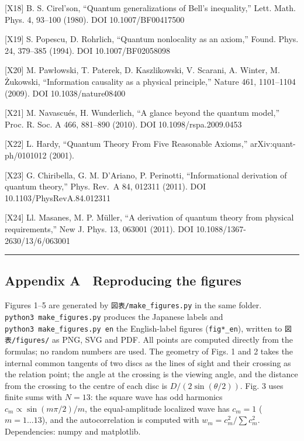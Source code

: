 \documentclass[
  a4paper,
]{article}
\begin{document}
{[}X18{]} B. S. Cirel'son, ``Quantum generalizations of Bell's
inequality,'' Lett. Math. Phys. 4, 93--100 (1980). DOI
10.1007/BF00417500

{[}X19{]} S. Popescu, D. Rohrlich, ``Quantum nonlocality as an axiom,''
Found. Phys. 24, 379--385 (1994). DOI 10.1007/BF02058098

{[}X20{]} M. Pawłowski, T. Paterek, D. Kaszlikowski, V. Scarani, A.
Winter, M. Żukowski, ``Information causality as a physical principle,''
Nature 461, 1101--1104 (2009). DOI 10.1038/nature08400

{[}X21{]} M. Navascués, H. Wunderlich, ``A glance beyond the quantum
model,'' Proc. R. Soc. A 466, 881--890 (2010). DOI
10.1098/rspa.2009.0453

{[}X22{]} L. Hardy, ``Quantum Theory From Five Reasonable Axioms,''
arXiv:quant-ph/0101012 (2001).

{[}X23{]} G. Chiribella, G. M. D'Ariano, P. Perinotti, ``Informational
derivation of quantum theory,'' Phys. Rev.~A 84, 012311 (2011). DOI
10.1103/PhysRevA.84.012311

{[}X24{]} Ll. Masanes, M. P. Müller, ``A derivation of quantum theory
from physical requirements,'' New J. Phys. 13, 063001 (2011). DOI
10.1088/1367-2630/13/6/063001

\begin{center}\rule{0.5\linewidth}{0.5pt}\end{center}

\subsection{Appendix A　Reproducing the
figures}\label{appendix-a-reproducing-the-figures}

Figures 1--5 are generated by \texttt{図表/\allowbreak{}make\_\allowbreak{}figures.py} in the same
folder. \texttt{python3\ make\_\allowbreak{}figures.py} produces the Japanese labels
and \texttt{python3\ make\_\allowbreak{}figures.py\ en} the English-label figures
(\texttt{fig*\_\allowbreak{}en}), written to \texttt{図表/\allowbreak{}figures/\allowbreak{}} as PNG, SVG and
PDF. All points are computed directly from the formulas; no random
numbers are used. The geometry of Figs. 1 and 2 takes the internal
common tangents of two discs as the lines of sight and their crossing as
the relation point; the angle at the crossing is the viewing angle, and
the distance from the crossing to the centre of each disc is
\(D/(2\sin(\theta/2))\). Fig. 3 uses finite sums with \(N=13\): the
square wave has odd harmonics \(c_m\propto\sin(m\pi/2)/m\), the
equal-amplitude localized wave has \(c_m=1\) (\(m=1\ldots13\)), and the
autocorrelation is computed with \(w_m=c_m^2/\sum c_m^2\). Dependencies:
numpy and matplotlib.
\end{document}
